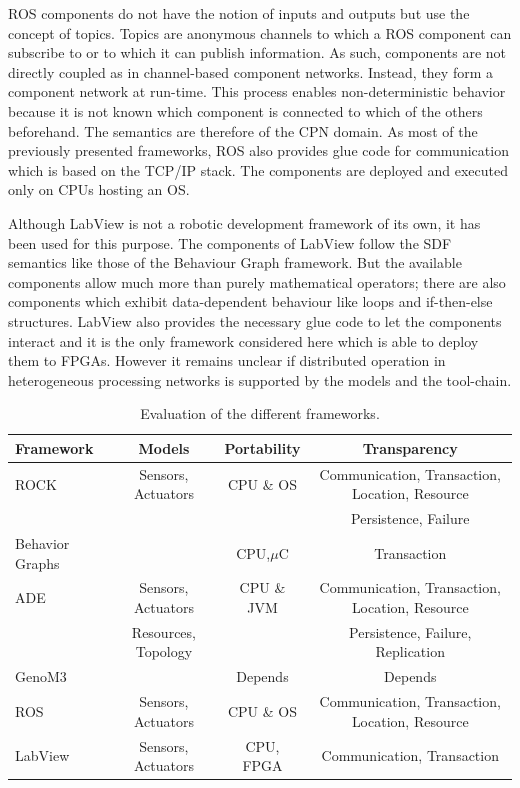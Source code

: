 \documentclass[a4paper,twocolumn]{esapub2005} %
\begin{document}
ROS components do not have the notion of inputs and outputs but use the concept of topics.
Topics are anonymous channels to which a ROS component can subscribe to or to which it can publish information.
As such, components are not directly coupled as in channel-based component networks.
Instead, they form a component network at run-time.
This process enables non-deterministic behavior because it is not known which component is connected to which of the others beforehand.
The semantics are therefore of the CPN domain.
As most of the previously presented frameworks, ROS also provides glue code for communication which is based on the TCP/IP stack.
The components are deployed and executed only on CPUs hosting an OS.

Although LabView is not a robotic development framework of its own, it has been used for this purpose.
The components of LabView follow the SDF semantics like those of the Behaviour Graph framework.
But the available components allow much more than purely mathematical operators; there are also components which exhibit data-dependent behaviour like loops and if-then-else structures.
LabView also provides the necessary glue code to let the components interact and it is the only framework considered here which is able to deploy them to FPGAs.
However it remains unclear if distributed operation in heterogeneous processing networks is supported by the models and the tool-chain.

\begin{table}
	\centering
	\begin{tabular}{l|ccc}
	\hline
	Framework        & Models & Portability & Transparency\\
	\hline
	ROCK             & Sensors, Actuators & CPU \& OS & Communication, Transaction, Location, Resource\\
	                 & & & Persistence, Failure\\
	Behavior Graphs  &        & CPU,$\mu$C & Transaction\\
	ADE              & Sensors, Actuators & CPU \& JVM & Communication, Transaction, Location, Resource\\
	                 & Resources, Topology & & Persistence, Failure, Replication\\
	GenoM3           & & Depends & Depends\\
	ROS              & Sensors, Actuators & CPU \& OS  & Communication, Transaction, Location, Resource\\
	LabView          & Sensors, Actuators & CPU, FPGA  & Communication, Transaction\\
	\end{tabular}
    \caption{
        Evaluation of the different frameworks.
    }
    \label{table:summary}
\end{table}
\end{document}
